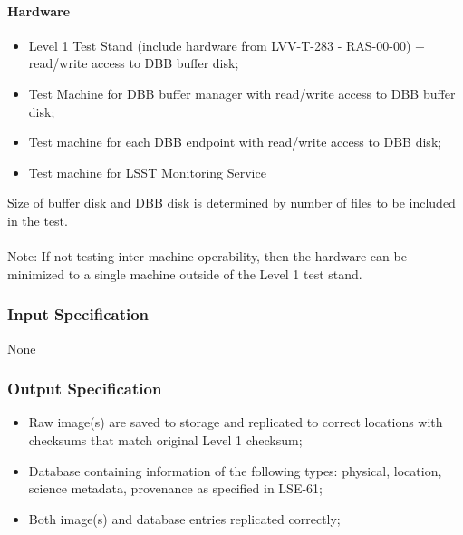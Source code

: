 \paragraph{Hardware}
\begin{itemize}
\tightlist
\item
  Level 1 Test Stand (include hardware from LVV-T-283 - RAS-00-00) +
  read/write access to DBB buffer disk;
\item
  Test Machine for DBB buffer manager with read/write access to DBB
  buffer disk;
\item
  Test machine for each DBB endpoint with read/write access to DBB disk;
\item
  Test machine for LSST Monitoring Service
\end{itemize}

Size of buffer disk and DBB disk is determined by number of files to be
included in the test.\\
~\\
Note: If not testing inter-machine operability, then the hardware can be
minimized to a single machine outside of the Level 1 test stand.


\subsubsection{Input Specification}
​​​​​None


\subsubsection{Output Specification}
\begin{itemize}
\tightlist
\item
  Raw image(s) are saved to storage and replicated to correct locations
  with checksums that match original Level 1 checksum;
\item
  Database containing information of the following types: physical,
  location, science metadata, provenance as specified in LSE-61;
\item
  Both image(s) and database entries replicated correctly;
\end{itemize}


